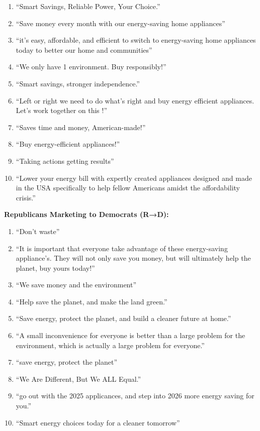 \documentclass[
  11pt,
  oneside]{article}
\providecommand{\tightlist}{%
  \setlength{\itemsep}{0pt}\setlength{\parskip}{0pt}}\usepackage{longtable,booktabs,array}
\begin{document}
\begin{enumerate}
\def\labelenumi{\arabic{enumi}.}
\tightlist
\item
  ``Smart Savings, Reliable Power, Your Choice.''
\item
  ``Save money every month with our energy-saving home appliances''
\item
  ``it's easy, affordable, and efficient to switch to energy-saving home
  appliances today to better our home and communities''
\item
  ``We only have 1 environment. Buy responsibly!''
\item
  ``Smart savings, stronger independence.''
\item
  ``Left or right we need to do what's right and buy energy efficient
  appliances. Let's work together on this !''
\item
  ``Saves time and money, American-made!''
\item
  ``Buy energy-efficient appliances!''
\item
  ``Taking actions getting results''
\item
  ``Lower your energy bill with expertly created appliances designed and
  made in the USA specifically to help fellow Americans amidst the
  affordability crisis.''
\end{enumerate}

\textbf{Republicans Marketing to Democrats (R→D):}

\begin{enumerate}
\def\labelenumi{\arabic{enumi}.}
\tightlist
\item
  ``Don't waste''
\item
  ``It is important that everyone take advantage of these energy-saving
  appliance's. They will not only save you money, but will ultimately
  help the planet, buy yours today!''
\item
  ``We save money and the environment''
\item
  ``Help save the planet, and make the land green.''
\item
  ``Save energy, protect the planet, and build a cleaner future at
  home.''
\item
  ``A small inconvenience for everyone is better than a large problem
  for the environment, which is actually a large problem for everyone.''
\item
  ``save energy, protect the planet''
\item
  ``We Are Different, But We ALL Equal.''
\item
  ``go out with the 2025 applicances, and step into 2026 more energy
  saving for you.''
\item
  ``Smart energy choices today for a cleaner tomorrow''
\end{enumerate}
\end{document}
